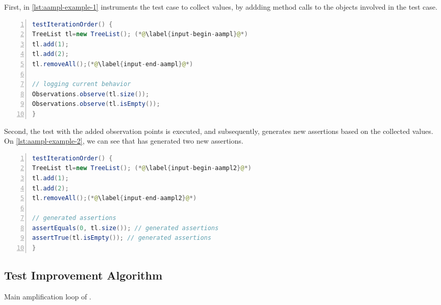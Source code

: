 First, in \autoref{lst:aampl-example-1} \dspot instruments the test case to collect values, by addding method calls to the objects involved in the test case.

\begin{lstlisting}[caption={In \Aampl{}, the second step is to instrument and run the test to collect runtime values.},label=lst:aampl-example-1,float,language=java,numbers=left] 
testIterationOrder() {
TreeList tl=new TreeList(); (*@\label{input-begin-aampl}@*)
tl.add(1);
tl.add(2);
tl.removeAll();(*@\label{input-end-aampl}@*)

// logging current behavior
Observations.observe(tl.size()); 
Observations.observe(tl.isEmpty()); 
}
\end{lstlisting}

Second, the test with the added observation points is executed, and subsequently, \dspot{} generates new assertions based on the collected values. On \autoref{lst:aampl-example-2}, we can see that \dspot has generated two new assertions.

\begin{lstlisting}[caption={In \Aampl{}, the last step is to generate the assertions based on the collected values.},label=lst:aampl-example-2,float,language=java,numbers=left] 
testIterationOrder() {
TreeList tl=new TreeList(); (*@\label{input-begin-aampl2}@*)
tl.add(1);
tl.add(2);
tl.removeAll();(*@\label{input-end-aampl2}@*)

// generated assertions
assertEquals(0, tl.size()); // generated assertions
assertTrue(tl.isEmpty()); // generated assertions
}
\end{lstlisting}

\subsection{Test Improvement Algorithm}
\label{subsec:algo}

\begin{algorithm}[t]
	\begin{algorithmic}[1]
		\EndFor
		\EndFor
		\EndFor
	\end{algorithmic}
	\caption{Main amplification loop of \dspot.}
	\label{algo:dspot_main}
\end{algorithm}

